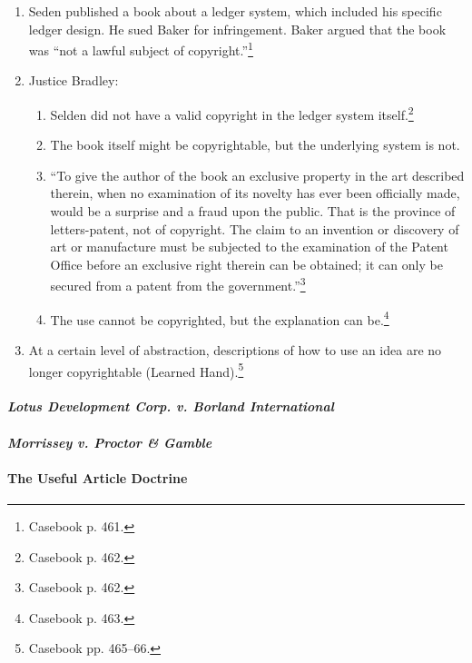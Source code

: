 \begin{enumerate}
    \item Seden published a book about a ledger system, which included his 
    specific ledger design. He sued Baker for infringement. Baker argued that 
    the book was ``not a lawful subject of copyright.''\footnote{Casebook p. 
    461.}
    \item Justice Bradley:
    \begin{enumerate}
        \item Selden did not have a valid copyright in the ledger system 
        itself.\footnote{Casebook p. 462.}
        \item The book itself might be copyrightable, but the underlying 
        system is not.
        \item ``To give the author of the book an exclusive property in the 
        art described therein, when no examination of its novelty has ever 
        been officially made, would be a surprise and a fraud upon the public. 
        That is the province of letters-patent, not of copyright. The claim to 
        an invention or discovery of art or manufacture must be subjected to 
        the examination of the Patent Office before an exclusive right therein 
        can be obtained; it can only be secured from a patent from the 
        government.''\footnote{Casebook p. 462.}
        \item The use cannot be copyrighted, but the explanation can 
        be.\footnote{Casebook p. 463.}
    \end{enumerate}
    \item At a certain level of abstraction, descriptions of how to use an 
    idea are no longer copyrightable (Learned Hand).\footnote{Casebook pp. 
    465--66.}
\end{enumerate}

\paragraph{\emph{Lotus Development Corp. v. Borland International}}


\paragraph{\emph{Morrissey v. Proctor \& Gamble}}


\paragraph{The Useful Article Doctrine}

